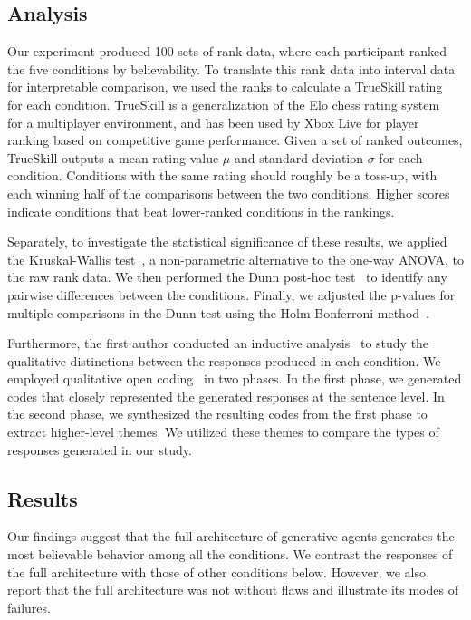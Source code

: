 \subsection{Analysis}
Our experiment produced 100 sets of rank data, where each participant ranked the five conditions by believability. To translate this rank data into interval data for interpretable comparison, we used the ranks to calculate a TrueSkill rating~\cite{79_TrueSkill} for each condition. TrueSkill is a generalization of the Elo chess rating system~\cite{80_Elo} for a multiplayer environment, and has been used by Xbox Live for player ranking based on competitive game performance. Given a set of ranked outcomes, TrueSkill outputs a mean rating value $\mu$ and standard deviation $\sigma$ for each condition. Conditions with the same rating should roughly be a toss-up, with each winning half of the comparisons between the two conditions. Higher scores indicate conditions that beat lower-ranked conditions in the rankings. 

Separately, to investigate the statistical significance of these results, we applied the Kruskal-Wallis test~\cite{Kruskal1952}, a non-parametric alternative to the one-way ANOVA, to the raw rank data. We then performed the Dunn post-hoc test~\cite{Upton2006} to identify any pairwise differences between the conditions. Finally, we adjusted the p-values for multiple comparisons in the Dunn test using the Holm-Bonferroni method~\cite{Holm1979}.

Furthermore, the first author conducted an inductive analysis~\cite{18_thomas2006general} to study the qualitative distinctions between the responses produced in each condition. We employed qualitative open coding~\cite{78_open_coding} in two phases. In the first phase, we generated codes that closely represented the generated responses at the sentence level. In the second phase, we synthesized the resulting codes from the first phase to extract higher-level themes. We utilized these themes to compare the types of responses generated in our study.

\subsection{Results}
Our findings suggest that the full architecture of generative agents generates the most believable behavior among all the conditions. We contrast the responses of the full architecture with those of other conditions below. However, we also report that the full architecture was not without flaws and illustrate its modes of failures.

